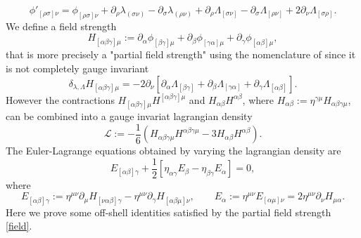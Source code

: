 \documentclass[a4paper,12pt]{article}
\begin{document}
\begin{equation}
    \phi'_{[\rho \sigma] \nu} = \phi_{[\rho \sigma ]\nu}+\partial_{\rho}\lambda_{(\sigma \nu)}-\partial_{\sigma}\lambda_{(\rho \nu)}+\partial_{\rho}\Lambda_{[\sigma \nu]}-\partial_{\sigma}\Lambda_{[\rho \nu]}+2\partial_{\nu}\Lambda_{[\sigma \rho]}.
\end{equation}
We define a field strength
\begin{equation}\label{field}
    H_{[\alpha \beta \gamma]\mu}:=\partial_{\alpha}\phi_{[\beta \gamma]\mu}+\partial_{\beta}\phi_{[\gamma \alpha]\mu}+\partial_{\gamma}\phi_{[\alpha \beta]\mu},
\end{equation}
that is more precisely a "partial field strength" using the nomenclature of \cite{Manzoni:2025zmi} since it is not completely gauge invariant
\begin{equation}
    \delta_{\lambda, \Lambda} H_{[\alpha \beta \gamma]\mu}=-2\partial_{\nu}[\partial_{\alpha}\Lambda_{[\beta \gamma]}+\partial_{\beta}\Lambda_{[ \gamma \alpha]}+\partial_{\gamma}\Lambda_{[\alpha \beta ]}].
\end{equation}
However the contractions $H_{[\alpha \beta \gamma]\mu}H^{[\alpha \beta \gamma]\mu}$ and $H_{\alpha \beta }H^{\alpha \beta }$,
where ${\displaystyle H_{\alpha \beta }:=\eta ^{\gamma \mu }H_{\alpha \beta \gamma \mu }}$, can be combined into a gauge invariat lagrangian density
\begin{equation}
    {\displaystyle \mathcal{L}:=-{\frac {1}{6}}(H_{\alpha \beta \gamma \mu }H^{\alpha \beta \gamma \mu }-3H_{\alpha \beta }H^{\alpha \beta }).}
    \label{laden}
\end{equation}
The Euler-Lagrange equations obtained by varying the lagrangian density are
\begin{equation}
    E_{[\alpha \beta]\gamma}+\frac{1}{2}[\eta_{\alpha \gamma}E_{\beta}-\eta_{\beta \gamma}E_{\alpha}]=0,
\end{equation}
where 
\begin{equation}
    E_{[\alpha \beta] \gamma}:=\eta^{\mu \nu}\partial_{\mu}H_{[\nu \alpha \beta] \gamma}-\eta^{\mu \nu}\partial_{\gamma}H_{[\alpha \beta \mu]\nu}, \qquad E_{\alpha}:=\eta^{\mu \nu}E_{[\alpha \mu]\nu}=2\eta^{\mu \nu}\partial_{\nu}H_{\mu \alpha}.
    \label{eomfs}
\end{equation}
Here we prove some off-shell identities satisfied by the partial field strength \eqref{field}.
\end{document}
